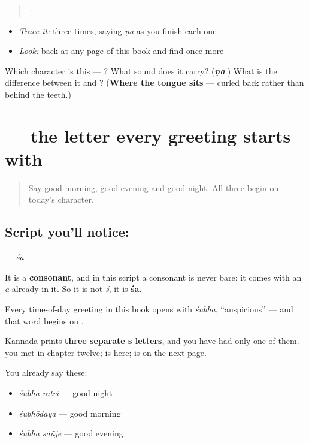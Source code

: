 \begin{quote}
  ·  
\end{quote}

\begin{itemize}
\raggedright
  \item \emph{Trace it:}  three times, saying \emph{ṇa} as you finish each one
  \item \emph{Look:} back at any page of this book and find  once more
\end{itemize}

\begin{tcolorbox}[breakable,colback=teal!4,colframe=teal!35!black,title={Before you move on}]
Which character is this — ? What sound does it carry? (\emph{\textbf{ṇa}}.) What is the difference between it and ? (\textbf{Where the tongue sits} — curled back rather than behind the teeth.)
\end{tcolorbox}
\section[\texorpdfstring{\kn{ಶ} (śa)}{ಶ (śa)}]{ — the letter every greeting starts with}

\label{lesson:KA-S165-letter-sha}



\begin{quote}
Say good morning, good evening and good night. All three begin on today's character.
\end{quote}

\subsection*{Script you'll notice: }
\textbf{} — \emph{śa}.

It is a \textbf{consonant}, and in this script a consonant is never bare: it comes with an \emph{a} already in it. So it is not \emph{ś}, it is \textbf{śa}.

Every time-of-day greeting in this book opens with \textbf{} \emph{śubha}, “auspicious” — and that word begins on .

Kannada prints \textbf{three separate s letters}, and you have had only one of them.  you met in chapter twelve;  is here;  is on the next page.

You already say these:

\begin{itemize}
\raggedright
  \item \textbf{ } \emph{śubha rātri} — good night
  \item \textbf{} \emph{śubhōdaya} — good morning
  \item \textbf{ } \emph{śubha sañje} — good evening
\end{itemize}

